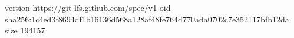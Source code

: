 version https://git-lfs.github.com/spec/v1
oid sha256:1c4ed3f8694df1b16136d568a128af48fe764d770ada0702c7e352117bfb12da
size 194157
